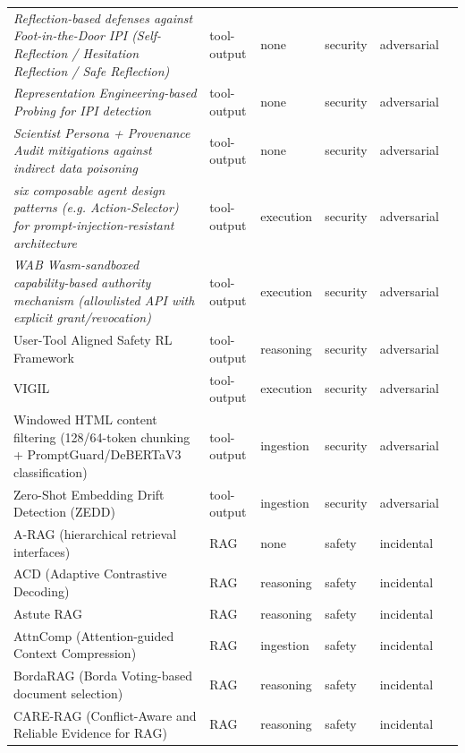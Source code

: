 \begin{longtable}{@{}>{\raggedright\arraybackslash}p{}lllll@{}}
\emph{Reflection-based defenses against Foot-in-the-Door IPI (Self-Reflection / Hesitation Reflection / Safe Reflection)} & tool-output & none & security & adversarial & \cite{nakash-2024-breaking} \\
\emph{Representation Engineering-based Probing for IPI detection} & tool-output & none & security & adversarial & \cite{zhu-2026-your} \\
\emph{Scientist Persona + Provenance Audit mitigations against indirect data poisoning} & tool-output & none & security & adversarial & \cite{gyevnar-2026-distributed} \\
\emph{six composable agent design patterns (e.g. Action-Selector) for prompt-injection-resistant architecture} & tool-output & execution & security & adversarial & \cite{beurerkellner-2025-design} \\
\emph{WAB Wasm-sandboxed capability-based authority mechanism (allowlisted API with explicit grant/revocation)} & tool-output & execution & security & adversarial & \cite{liu-2026-wab} \\
User-Tool Aligned Safety RL Framework & tool-output & reasoning & security & adversarial & \cite{sha-2025-agent} \\
VIGIL & tool-output & execution & security & adversarial & \cite{lin-2026-vigil} \\
Windowed HTML content filtering (128/64-token chunking + PromptGuard/DeBERTaV3 classification) & tool-output & ingestion & security & adversarial & \cite{dinu-2025-disrupting} \\
Zero-Shot Embedding Drift Detection (ZEDD) & tool-output & ingestion & security & adversarial & \cite{sekar-2026-zeroshot} \\
A-RAG (hierarchical retrieval interfaces) & RAG & none & safety & incidental & \cite{du-2026-arag} \\
ACD (Adaptive Contrastive Decoding) & RAG & reasoning & safety & incidental & \cite{kim-2024-adaptive} \\
Astute RAG & RAG & reasoning & safety & incidental & \cite{wang-2024-astute} \\
AttnComp (Attention-guided Context Compression) & RAG & ingestion & safety & incidental & \cite{luo-2025-attncomp} \\
BordaRAG (Borda Voting-based document selection) & RAG & reasoning & safety & incidental & \cite{li-2025-bordarag} \\
CARE-RAG (Conflict-Aware and Reliable Evidence for RAG) & RAG & reasoning & safety & incidental & \cite{chen-2025-rethinking} \\

\end{longtable}
